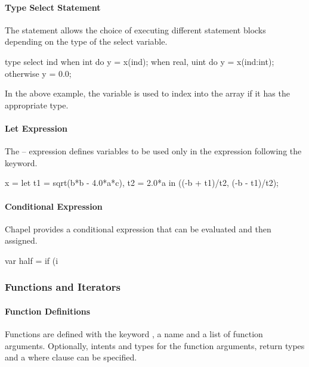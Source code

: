 \paragraph{Type Select Statement} 
The  statement allows the choice of
executing different statement blocks depending on the type
of the select variable.

\begin{example}
\begin{chapel}
type select ind {
  when int do y = x(ind);
  when real, uint do y = x(ind:int);
  otherwise y = 0.0;
}
\end{chapel}
In the above example, the variable  is used
to index into the array  if it has the appropriate
type.
\end{example}

\paragraph{Let Expression} 
The -- expression defines variables to
be used only in the expression following the  keyword.

\begin{example}
\begin{chapel}
x = let t1 = sqrt(b*b - 4.0*a*c), t2 = 2.0*a
    in ((-b + t1)/t2, (-b - t1)/t2);
\end{chapel}
\end{example}

\paragraph{Conditional Expression} 
Chapel provides a conditional expression that can be evaluated
and then assigned.

\begin{example}
\begin{chapel}
var half = if (i %
\end{chapel}
\end{example}

\subsubsection{Functions and Iterators}
\paragraph{Function Definitions}
Functions are defined with the keyword , a name and a list of function
arguments.  Optionally, intents and types for the function arguments, return types and 
a where clause can be specified.  

